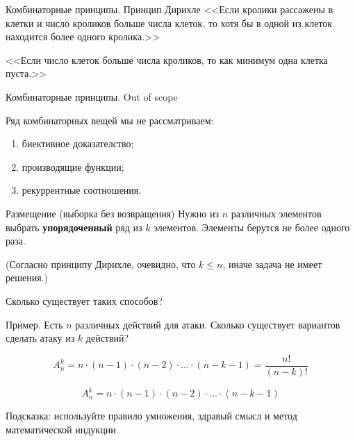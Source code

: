 \begin{frame}{Комбинаторные принципы. Принцип Дирихле}
<<Если кролики рассажены в клетки и число кроликов больше числа клеток, то хотя бы в одной из клеток находится более одного кролика.>>

<<Если число клеток больше числа кроликов, то как минимум одна клетка пуста.>>
\end{frame}

\begin{frame}{Комбинаторные принципы. Out of scope}

Ряд комбинаторных вещей мы не рассматриваем:
\begin{enumerate}
	\item биективное доказателство; 
	\item производящие функции;
	\item рекуррентные соотношения.
\end{enumerate}

\end{frame}


\begin{frame}{Размещение (выборка без возвращения)}
Нужно из
$n$
различных элементов 
выбрать \textbf{упорядоченный}
ряд из $k$
элементов. 
Элементы берутся не более одного раза.

(Согласно принципу Дирихле, очевидно, что $k \leqslant n$,
иначе задача не имеет решения.)


Сколько существует таких способов?   

Пример.
Есть $n$ различных действий для атаки.
Сколько существует вариантов сделать атаку из $k$ действий?

\begin{equation}
A_n^k = n \cdot (n-1) \cdot (n-2) \cdot ... \cdot (n-k-1) = \frac{n!} {\left(n-k\right)!}
\end{equation}    


\end{frame}

\begin{frame}


\begin{equation}
A_n^k = n \cdot (n-1) \cdot (n-2) \cdot ... \cdot (n-k-1)
\end{equation}  

Подсказка: используйте правило умножения, здравый смысл 
и метод математической индукции

\end{frame}



